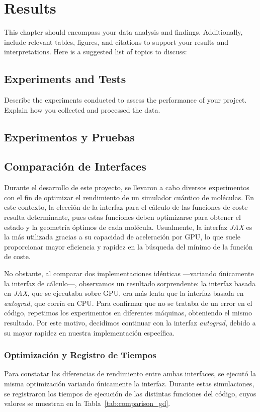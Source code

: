 \chapter{Results}
This chapter should encompass your data analysis and findings. Additionally, include relevant tables, figures, and citations to support your results and interpretations. Here is a suggested list of topics to discuss:

  \section{Experiments and Tests}
  Describe the experiments conducted to assess the performance of your project. Explain how you collected and processed the data.



\section{Experimentos y Pruebas}

\section{Comparación de Interfaces}
Durante el desarrollo de este proyecto, se llevaron a cabo diversos experimentos con el fin de optimizar el rendimiento de un simulador cuántico de moléculas. En este contexto, la elección de la interfaz para el cálculo de las funciones de coste resulta determinante, pues estas funciones deben optimizarse para obtener el estado y la geometría óptimos de cada molécula. Usualmente, la interfaz \textit{JAX} es la más utilizada gracias a su capacidad de aceleración por GPU, lo que suele proporcionar mayor eficiencia y rapidez en la búsqueda del mínimo de la función de coste.

No obstante, al comparar dos implementaciones idénticas —variando únicamente la interfaz de cálculo—, observamos un resultado sorprendente: la interfaz basada en \textit{JAX}, que se ejecutaba sobre GPU, era más lenta que la interfaz basada en \textit{autograd}, que corría en CPU. Para confirmar que no se trataba de un error en el código, repetimos los experimentos en diferentes máquinas, obteniendo el mismo resultado. Por este motivo, decidimos continuar con la interfaz \textit{autograd}, debido a su mayor rapidez en nuestra implementación específica.

\subsection{Optimización y Registro de Tiempos}
Para constatar las diferencias de rendimiento entre ambas interfaces, se ejecutó la misma optimización variando únicamente la interfaz. Durante estas simulaciones, se registraron los tiempos de ejecución de las distintas funciones del código, cuyos valores se muestran en la Tabla~\ref{tab:comparison_gd}.

